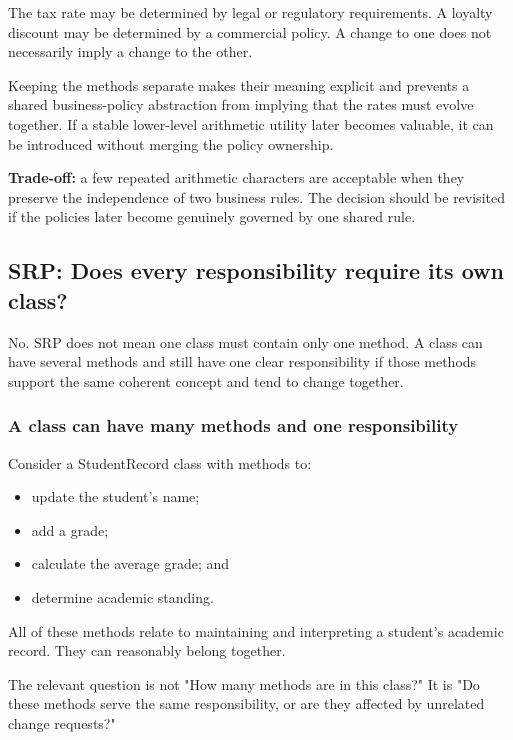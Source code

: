 \documentclass[12pt,a4paper]{article}
\begin{document}
The tax rate may be determined by legal or regulatory requirements. A loyalty discount may be determined by a commercial policy. A change to one does not necessarily imply a change to the other.

Keeping the methods separate makes their meaning explicit and prevents a shared business-policy abstraction from implying that the rates must evolve together. If a stable lower-level arithmetic utility later becomes valuable, it can be introduced without merging the policy ownership.

\textbf{Trade-off:} a few repeated arithmetic characters are acceptable when they preserve the independence of two business rules. The decision should be revisited if the policies later become genuinely governed by one shared rule.

\subsection{SRP: Does every responsibility require its own class?}

No. SRP does not mean one class must contain only one method. A class can have several methods and still have one clear responsibility if those methods support the same coherent concept and tend to change together.

\subsubsection{A class can have many methods and one responsibility}

Consider a StudentRecord class with methods to:

\begin{itemize}

\item update the student's name;

\item add a grade;

\item calculate the average grade; and

\item determine academic standing.

\end{itemize}

All of these methods relate to maintaining and interpreting a student's academic record. They can reasonably belong together.

The relevant question is not "How many methods are in this class?" It is "Do these methods serve the same responsibility, or are they affected by unrelated change requests?"
\end{document}
